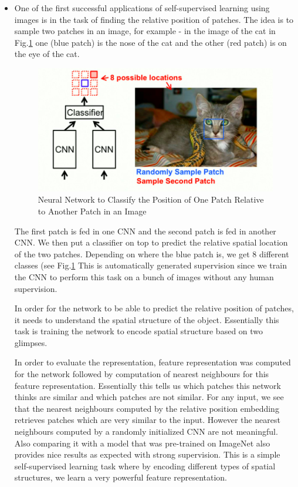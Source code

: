 \begin{itemize}
    
\item One of the first successful applications of self-supervised learning using images is in the task of finding the relative position of patches. The idea is to sample two patches in an image, for example - in the image of the cat in Fig.\ref{fig:relpatch} one (blue patch) is the nose of the cat and the other (red patch) is on the eye of the cat. 

\begin{figure}[H]
  \includegraphics[width=\linewidth]{figs/RelativePosition.jpg}
  \caption{Neural Network to Classify the Position of One Patch Relative to Another Patch in an Image}
  \label{fig:relpatch}
\end{figure}

The first patch is fed in one CNN and the second patch is fed in another CNN. We then put a classifier on top to predict the relative spatial location of the two patches. Depending on where the blue patch is, we get 8 different classes (see Fig.\ref{fig:relpatch} This is automatically generated supervision since we train the CNN to perform this task on a bunch of images without any human supervision.

In order for the network to be able to predict the relative position of patches, it needs to understand the spatial structure of the object. Essentially this task is training the network to encode spatial structure based on two glimpses.

In order to evaluate the representation, feature representation was computed for the network followed by computation of nearest neighbours for this feature representation. Essentially this tells us which patches this network thinks are similar and which patches are not similar. For any input, we see that the nearest neighbours computed by the relative position embedding retrieves patches which are very similar to the input. However the nearest neighbours computed by a randomly initialized CNN are not meaningful. Also comparing it with a model that was pre-trained on ImageNet also provides nice results as expected with strong supervision. This is a simple self-supervised learning task where by encoding different types of spatial structures, we learn a very powerful feature representation.


\end{itemize}
